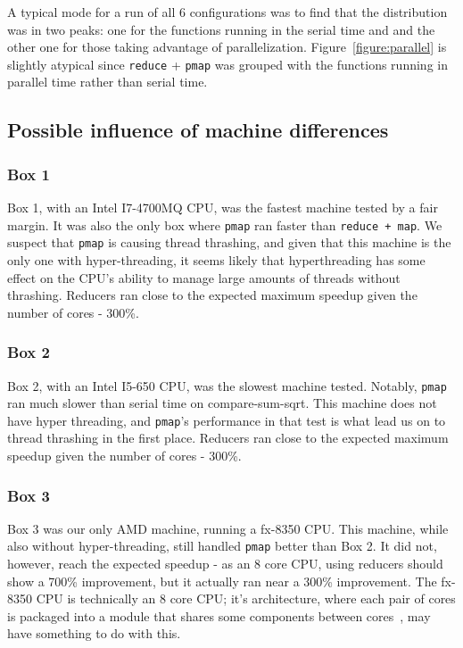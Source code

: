 \documentclass[12pt]{article}
\newcommand{\comment}[1]{{\bf \tt  {#1}}}
\newcommand{\hfcomment}[1]{\textcolor{Teal}{\comment{Henry: {#1}}}}
\newcommand{\clocode}[1]{{\texttt {#1}}}
\begin{document}
A typical mode for a run of all 6 configurations was to find that the distribution was in two peaks: one for the functions running in the serial time and and the other one for those taking advantage of parallelization. Figure~\ref{figure:parallel} is slightly atypical since \clocode{reduce} + \clocode{pmap} was grouped with the functions running in parallel time rather than serial time. 

\subsection{Possible influence of machine differences }\label{sec:boxdiscussion}

\subsubsection{Box 1}

Box 1, with an Intel I7-4700MQ CPU, was the fastest machine tested by a fair margin. It was also the only box where \clocode{pmap} ran faster than \clocode{reduce + map}. We suspect that \clocode{pmap} is causing thread thrashing, and given that this machine is the only one with hyper-threading, it seems likely that hyperthreading has some effect on the CPU's ability to manage large amounts of threads without thrashing. Reducers ran close to the expected maximum speedup given the number of cores - 300\%.

\subsubsection{Box 2}

Box 2, with an Intel I5-650 CPU, was the slowest machine tested. Notably, \clocode{pmap} ran much slower than serial time on compare-sum-sqrt. This machine does not have hyper threading, and \clocode{pmap}'s performance in that test is what lead us on to thread thrashing in the first place. Reducers ran close to the expected maximum speedup given the number of cores - 300\%.

\subsubsection{Box 3}

Box 3 was our only AMD machine, running a fx-8350 CPU. This machine, while also without hyper-threading, still handled \clocode{pmap} better than Box 2. It did not, however, reach the expected speedup - as an 8 core CPU, using reducers should show a 700\% improvement, but it actually ran near a 300\% improvement. The fx-8350 CPU is technically an 8 core CPU; it's architecture, where each pair of cores is packaged into a module that shares some components between cores~\cite{McIntyre:2012}, may have something to do with this.
\end{document}
